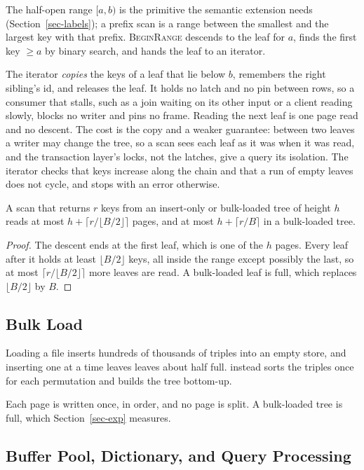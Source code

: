 The half-open range $[a,b)$ is the primitive the semantic extension needs
(Section~\ref{sec-labels}); a prefix scan is a range between the smallest and
the largest key with that prefix.
\textsc{BeginRange} descends to the leaf for $a$, finds the first key
$\ge a$ by binary search, and hands the leaf to an iterator.


The iterator \emph{copies} the keys of a leaf that lie below $b$, remembers
the right sibling's id, and releases the leaf.
It holds no latch and no pin between rows, so a consumer that stalls, such as
a join waiting on its other input or a client reading slowly, blocks no
writer and pins no frame.
Reading the next leaf is one page read and no descent.
The cost is the copy and a weaker guarantee: between two leaves a writer may
change the tree, so a scan sees each leaf as it was when it was read, and
the transaction layer's locks, not the latches, give a query its isolation.
The iterator checks that keys increase along the chain and that a run of
empty leaves does not cycle, and stops with an error otherwise.

\begin{lemma}\label{lem-scan}
A scan that returns $r$ keys from an insert-only or bulk-loaded tree of
height $h$ reads at most $h + \lceil r/\lfloor B/2\rfloor\rceil$ pages, and at
most $h + \lceil r/B\rceil$ in a bulk-loaded tree.
\end{lemma}
\begin{proof}
The descent ends at the first leaf, which is one of the $h$ pages.
Every leaf after it holds at least $\lfloor B/2\rfloor$ keys, all inside the
range except possibly the last, so at most $\lceil r/\lfloor
B/2\rfloor\rceil$ more leaves are read.
A bulk-loaded leaf is full, which replaces $\lfloor B/2\rfloor$ by $B$.
\end{proof}

\subsection{Bulk Load}

Loading a file inserts hundreds of thousands of triples into an empty store,
and inserting one at a time leaves leaves about half full.
\sys instead sorts the triples once for each permutation and builds the tree
bottom-up.


Each page is written once, in order, and no page is split.
A bulk-loaded tree is full, which Section~\ref{sec-exp} measures.

\subsection{Buffer Pool, Dictionary, and Query Processing}

